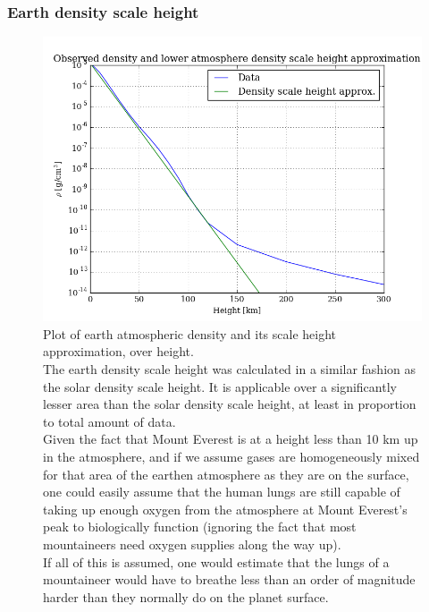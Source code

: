 \documentclass[11pt,a4paper,notitlepage]{article}
\begin{document}
\subsubsection{Earth density scale height}
\begin{figure}[H]
\center

	\includegraphics[scale=0.42]{../figs/earth_densityscales.png}
	\caption{Plot of earth atmospheric density and its scale height approximation, over height.\\
	The earth density scale height was calculated in a similar fashion as the solar density scale height. It is applicable over a significantly lesser area than the solar density scale height, at least in proportion to total amount of data.\\
	Given the fact that Mount Everest is at a height less than 10 km up in the atmosphere, and if we assume gases are homogeneously mixed for that area of the earthen atmosphere as they are on the surface, one could easily assume that the human lungs are still capable of taking up enough oxygen from the atmosphere at Mount Everest's peak to biologically function (ignoring the fact that most mountaineers need oxygen supplies along the way up).\\
	If all of this is assumed, one would estimate that the lungs of a mountaineer would have to breathe less than an order of magnitude harder than they normally do on the planet surface.}
\end{figure}
\end{document}

